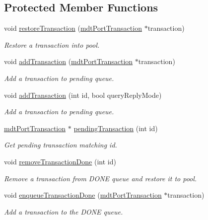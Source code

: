 \subsection*{Protected Member Functions}
\begin{DoxyCompactItemize}
\item 
void \hyperlink{classmdt_port_manager_a5fea4a9b8e94d38e8ec699dba05c7ca8}{restoreTransaction} (\hyperlink{classmdt_port_transaction}{mdtPortTransaction} $\ast$transaction)
\begin{DoxyCompactList}\small\item\em Restore a transaction into pool. \end{DoxyCompactList}\item 
void \hyperlink{classmdt_port_manager_ae5357262f1a0d6b95cc3fc7b975cdd38}{addTransaction} (\hyperlink{classmdt_port_transaction}{mdtPortTransaction} $\ast$transaction)
\begin{DoxyCompactList}\small\item\em Add a transaction to pending queue. \end{DoxyCompactList}\item 
void \hyperlink{classmdt_port_manager_a4b5300fbf05c2c267ca3a247ac3ab77f}{addTransaction} (int id, bool queryReplyMode)
\begin{DoxyCompactList}\small\item\em Add a transaction to pending queue. \end{DoxyCompactList}\item 
\hyperlink{classmdt_port_transaction}{mdtPortTransaction} $\ast$ \hyperlink{classmdt_port_manager_a117486e5720465e1295d337063d536c2}{pendingTransaction} (int id)
\begin{DoxyCompactList}\small\item\em Get pending transaction matching id. \end{DoxyCompactList}\item 
void \hyperlink{classmdt_port_manager_ada4b906ade973dfd45200dacbfe63f73}{removeTransactionDone} (int id)
\begin{DoxyCompactList}\small\item\em Remove a transaction from DONE queue and restore it to pool. \end{DoxyCompactList}\item 
void \hyperlink{classmdt_port_manager_ad024a2db17ae2e6459da0adad3d7c3c8}{enqueueTransactionDone} (\hyperlink{classmdt_port_transaction}{mdtPortTransaction} $\ast$transaction)
\begin{DoxyCompactList}\small\item\em Add a transaction to the DONE queue. \end{DoxyCompactList}\item 

\end{DoxyCompactItemize}
